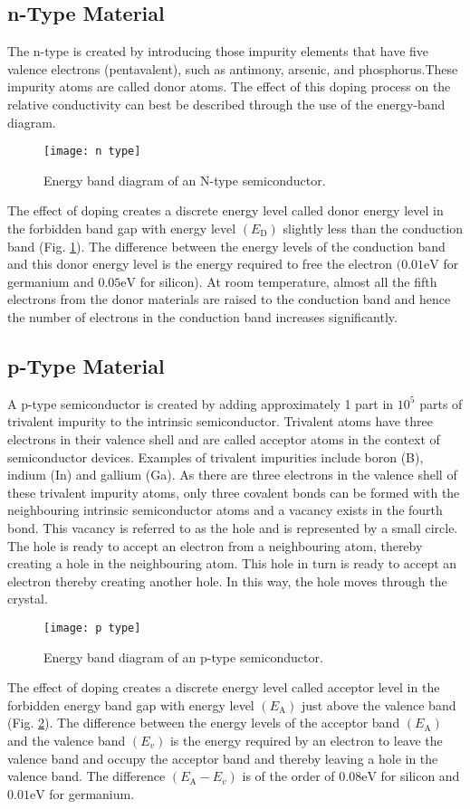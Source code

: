 \subsection{n-Type Material}
The n-type is created by introducing those impurity elements that have five valence electrons (pentavalent), such as antimony, arsenic, and phosphorus.These impurity atoms are called donor atoms. The effect of this doping process on the relative conductivity can best be described
through the use of the energy-band diagram.
\begin{figure}[H]
	\centering
	\texttt{[image: n type]}
	\caption{Energy band diagram of an N-type
		semiconductor.}
	\label{n type}
\end{figure}
The effect of doping creates a discrete energy level called donor energy level in the forbidden band gap with energy level $\left(E_{\mathrm{D}}\right)$ slightly less than the conduction band (Fig. \ref{n type}). The difference between the energy levels of the conduction band and this donor energy level is the energy required to free the electron $(0.01 \mathrm{eV}$ for germanium and $0.05 \mathrm{eV}$ for silicon). At room temperature, almost all the fifth electrons from the donor materials are raised to the conduction band and hence the number of electrons in the conduction band increases significantly.
\subsection{p-Type Material}
A p-type semiconductor is created by adding approximately 1 part in $10^{5}$ parts of trivalent impurity to the intrinsic semiconductor. Trivalent atoms have three electrons in their valence shell and are called acceptor atoms in the context of semiconductor devices. Examples of trivalent impurities include boron (B), indium (In) and gallium (Ga). As there are three electrons in the valence shell of these trivalent impurity atoms, only three covalent bonds can be formed with the neighbouring intrinsic semiconductor atoms and a vacancy exists in the fourth
bond. This vacancy is referred to as the hole and is represented by a small circle. The hole
is ready to accept an electron from a neighbouring atom, thereby creating a hole in the neighbouring atom. This hole in turn is ready to accept an electron thereby creating another hole. In this way, the hole moves through the crystal.
\begin{figure}[H]
	\centering
	\texttt{[image: p type]}
	\caption{Energy band diagram of an p-type
		semiconductor.}
	\label{p-type}
\end{figure}
The effect of doping creates a discrete energy level called acceptor level in the forbidden energy band gap with energy level $\left(E_{\mathrm{A}}\right)$ just above the valence band (Fig. \ref{p-type}). The difference between the energy levels of the acceptor band $\left(E_{\mathrm{A}}\right)$ and the valence band $\left(E_{v}\right)$ is the energy required by an electron to leave the valence band and occupy the acceptor band and thereby leaving a hole in the valence band. The difference $\left(E_{\mathrm{A}}-E_{v}\right)$ is of the order of $0.08 \mathrm{eV}$ for silicon and $0.01 \mathrm{eV}$ for germanium.

